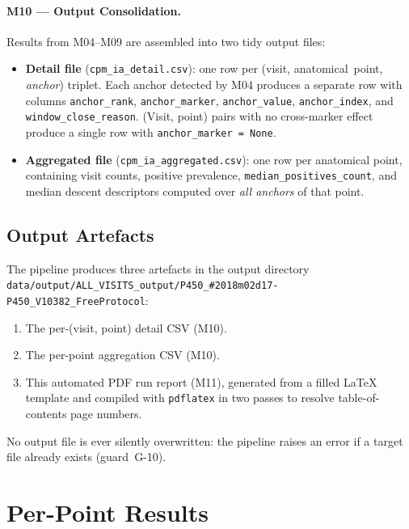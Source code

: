 \documentclass[a4paper,11pt]{article}
\begin{document}
\paragraph{M10 --- Output Consolidation.}
Results from M04--M09 are assembled into two tidy output files:
\begin{itemize}
  \item \textbf{Detail file} (\texttt{cpm\_ia\_detail.csv}): one row per
        (visit, anatomical~point, \emph{anchor}) triplet. Each anchor detected by M04
        produces a separate row with columns \texttt{anchor\_rank},
        \texttt{anchor\_marker}, \texttt{anchor\_value}, \texttt{anchor\_index},
        and \texttt{window\_close\_reason}.
        (Visit, point) pairs with no cross-marker effect produce a single row with
        \texttt{anchor\_marker = None}.
  \item \textbf{Aggregated file} (\texttt{cpm\_ia\_aggregated.csv}): one row per
        anatomical point, containing visit counts, positive prevalence,
        \texttt{median\_positives\_count}, and median descent descriptors computed over
        \emph{all anchors} of that point.
\end{itemize}

\subsection{Output Artefacts}

The pipeline produces three artefacts in the output directory \texttt{data/output/ALL\_VISITS\_output/P450\_\#2018m02d17-P450\_V10382\_FreeProtocol}:
\begin{enumerate}
  \item The per-(visit, point) detail CSV (M10).
  \item The per-point aggregation CSV (M10).
  \item This automated PDF run report (M11), generated from a filled \LaTeX{} template
        and compiled with \texttt{pdflatex} in two passes to resolve table-of-contents
        page numbers.
\end{enumerate}
No output file is ever silently overwritten: the pipeline raises an error if a target
file already exists (guard~G-10).

\section{Per-Point Results}
\end{document}
